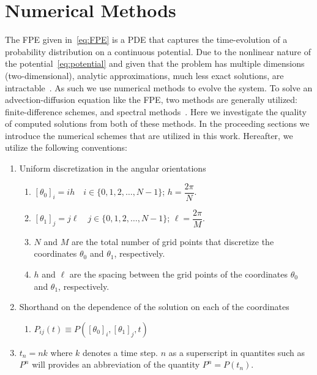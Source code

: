 \documentclass[11pt]{article}
\begin{document}
\section{Numerical Methods}

The FPE given in~\eqref{eq:FPE} is a PDE that captures the time-evolution of a probability distribution on a continuous potential. Due to the nonlinear nature of the potential~\eqref{eq:potential} and given that the problem has multiple dimensions (two-dimensional), analytic approximations, much less exact solutions, are intractable~\cite{risken_fpe}. As such we use numerical methods to evolve the system. To solve an advection-diffusion equation like the FPE, two methods are generally utilized: finite-difference schemes, and spectral methods~\cite{numerical_recipes}. Here we investigate the quality of computed solutions from both of these methods. In the proceeding sections we introduce the numerical schemes that are utilized in this work. Hereafter, we utilize the following conventions:
\begin{enumerate}
    \item Uniform discretization in the angular orientations
    \begin{enumerate}[label=--]
        \item $\left[\theta_{0}\right]_{i} = ih\quad i\in\{0, 1, 2, \dots, N-1\}$; $h = \dfrac{2\pi}{N}$.
        \item $\left[\theta_{1}\right]_{j} = j\ell\quad j\in\{0, 1, 2, \dots, N-1\}$; $\ell = \dfrac{2\pi}{M}$.
        \item $N$ and $M$ are the total number of grid points that discretize the coordinates $\theta_{0}$ and $\theta_{1}$, respectively.
        \item $h$ and $\ell$ are the spacing between the grid points of the coordinates $\theta_{0}$ and $\theta_{1}$, respectively.
    \end{enumerate}
    \item Shorthand on the dependence of the solution on each of the coordinates
    \begin{enumerate}[label=--]
        \item $P_{ij}(t) \equiv P\left(\left[\theta_{0}\right]_{i},\left[\theta_{1}\right]_{j},t\right)$
    \end{enumerate}
    \item $t_{n} = nk$ where $k$ denotes a time step. $n$ as a superscript in quantites such as $P^{n}$ will provides an abbreviation of the quantity $P^{n} = P(t_{n})$.
\end{enumerate}
\end{document}
